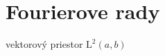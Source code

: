 \section{Fourierove rady}
\def\L{\mbox{L}}

\begin{definicia}
vektorový priestor $\L^2(a,b)$
\end{definicia}

